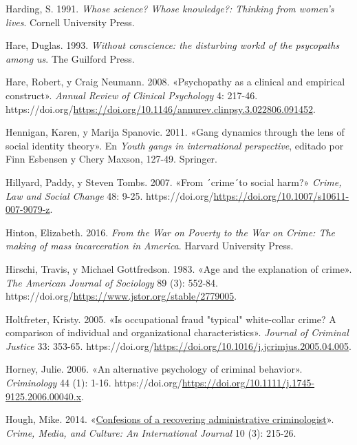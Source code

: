 \documentclass[
  spanish,
  letterpaper,
  DIV=11,
  numbers=noendperiod]{scrreprt}
\newlength{\cslhangindent}
\newenvironment{CSLReferences}[2] %
 {\begin{list}{}{%
  \setlength{\itemindent}{0pt}
  \setlength{\leftmargin}{0pt}
  \setlength{\parsep}{0pt}
  \ifodd #1
   \setlength{\leftmargin}{\cslhangindent}
   \setlength{\itemindent}{-1\cslhangindent}
  \fi
  \setlength{\itemsep}{#2\baselineskip}}}
 {\end{list}}
\begin{document}
\begin{CSLReferences}{1}{0}
Harding, S. 1991. \emph{Whose science? Whose knowledge?: Thinking from
women's lives}. Cornell University Press.

Hare, Duglas. 1993. \emph{Without conscience: the disturbing workd of
the psycopaths among us}. The Guilford Press.

Hare, Robert, y Craig Neumann. 2008. {«Psychopathy as a clinical and
empirical construct»}. \emph{Annual Review of Clinical Psychology} 4:
217-46.
https://doi.org/\url{https://doi.org/10.1146/annurev.clinpsy.3.022806.091452}.

Hennigan, Karen, y Marija Spanovic. 2011. {«Gang dynamics through the
lens of social identity theory»}. En \emph{Youth gangs in international
perspective}, editado por Finn Esbensen y Chery Maxson, 127-49.
Springer.

Hillyard, Paddy, y Steven Tombs. 2007. {«From ´crime´to social harm?»}
\emph{Crime, Law and Social Change} 48: 9-25.
https://doi.org/\url{https://doi.org/10.1007/s10611-007-9079-z}.

Hinton, Elizabeth. 2016. \emph{From the War on Poverty to the War on
Crime: The making of mass incarceration in America}. Harvard University
Press.

Hirschi, Travis, y Michael Gottfredson. 1983. {«Age and the explanation
of crime»}. \emph{The American Journal of Sociology} 89 (3): 552-84.
https://doi.org/\url{https://www.jstor.org/stable/2779005}.

Holtfreter, Kristy. 2005. {«Is occupational fraud "typical" white-collar
crime? A comparison of individual and organizational characteristics»}.
\emph{Journal of Criminal Justice} 33: 353-65.
https://doi.org/\url{https://doi.org/10.1016/j.jcrimjus.2005.04.005}.

Horney, Julie. 2006. {«An alternative psychology of criminal behavior»}.
\emph{Criminology} 44 (1): 1-16.
https://doi.org/\url{https://doi.org/10.1111/j.1745-9125.2006.00040.x}.

Hough, Mike. 2014. {«\href{}{Confesions of a recovering administrative
criminologist}»}. \emph{Crime, Media, and Culture: An International
Journal} 10 (3): 215-26.


\end{CSLReferences}
\end{document}
